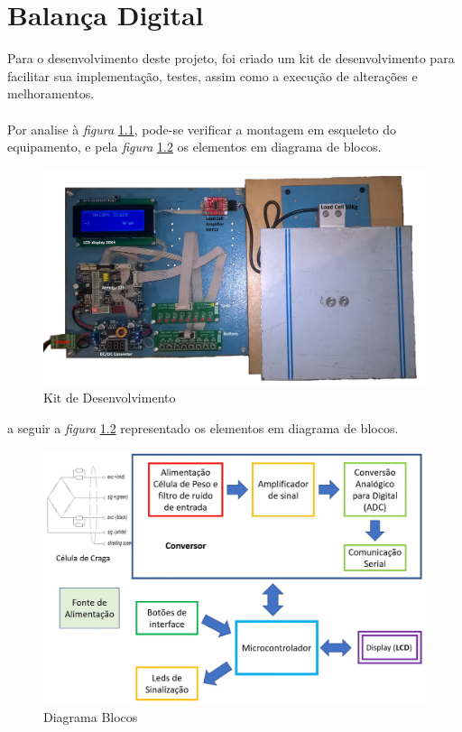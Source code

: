 \chapter{Balança Digital}
Para o desenvolvimento deste projeto, foi criado um kit de desenvolvimento para facilitar sua implementação, testes, assim como a execução de alterações e melhoramentos.
\\
\\
Por analise à \textit{figura} \ref{Kit_Desenvolvimento_2}, pode-se verificar a montagem em esqueleto do equipamento, e pela \textit{figura} \ref{Block_diagram_1} os elementos em diagrama de blocos.
\begin{figure}[H]
	\centering
	\includegraphics[scale=0.12]{./image/PESTA/kit/Kit_Desenvolvimento_2.jpg}
	\caption{Kit de Desenvolvimento}
	\label{Kit_Desenvolvimento_2}
\end{figure}
a seguir a \textit{figura} \ref{Block_diagram_1} representado os elementos em diagrama de blocos.
\begin{figure}[H]
	\centering
	\includegraphics[scale=0.27]{./image/PESTA/Diagrama/Diagrama_bloco_3.jpg}
	\caption{Diagrama Blocos}
	\label{Block_diagram_1}
\end{figure}
